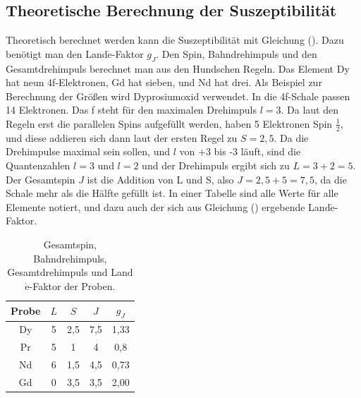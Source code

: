 \subsection{Theoretische Berechnung der Suszeptibilität}
Theoretisch berechnet werden kann die Suszeptibilität mit Gleichung (). Dazu benötigt man den Land$\acute{\text{e}}$-Faktor $g_J$. Den Spin, Bahndrehimpuls und den Gesamtdrehimpuls berechnet man aus den Hundschen Regeln.
Das Element Dy hat neun 4f-Elektronen, Gd hat sieben, und Nd hat drei. Als Beispiel zur Berechnung der Größen wird Dyprosiumoxid verwendet.
In die 4f-Schale passen 14 Elektronen. Das f steht für den maximalen Drehimpuls $l = 3$. 
Da laut den Regeln erst die parallelen Spins aufgefüllt werden, haben 5 Elektronen Spin $\frac{1}{2}$,
und diese addieren sich dann laut der ersten Regel zu $S= 2,5$.
Da die Drehimpulse maximal sein sollen, und $l$ von +3 bis -3 läuft, sind die Quantenzahlen $l=3$ und $l=2$ und der Drehimpuls ergibt sich zu $L=3+2=5$.
Der Gesamtspin $J$ ist die Addition von L und S, also $J=2,5+5=7,5$, da die Schale mehr als die Hälfte gefüllt ist.
In einer Tabelle sind alle Werte für alle Elemente notiert, und dazu auch der sich aus Gleichung () ergebende Land$\acute{\text{e}}$-Faktor.
\begin{table}[H]
  \centering
  \caption{Gesamtspin, Bahndrehimpuls, Gesamtdrehimpuls und Land$\acute{\text{e}}$-Faktor der Proben.}
  \label{tab:Dy}
  \begin{tabular}{c c c c c}
    \toprule
    Probe & $L$ & $S$ & $J$  & $g_J$  \\
    \midrule
    Dy & 5 & 2,5 & 7,5 & 1,33\\
    Pr & 5 & 1 & 4 & 0,8 \\
    Nd & 6 & 1,5 & 4,5 & 0,73\\
    Gd & 0 & 3,5 & 3,5 & 2,00\\
    \bottomrule
  \end{tabular}
\end{table}

